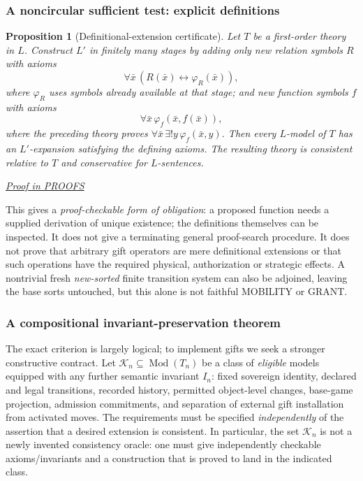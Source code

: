 \documentclass[11pt,letterpaper]{article}
\newtheorem{proposition}[theorem]{Proposition}
\theoremstyle{definition}\newtheorem{definition}[theorem]{Definition}\newtheorem{example}[theorem]{Example}
\theoremstyle{remark}\newtheorem{remark}[theorem]{Remark}
\newcommand{\Mod}{\operatorname{Mod}}
\newcommand{\prooflink}[1]{\par\noindent\hfill\small\hyperref[#1]{\textit{Proof in PROOFS}}\normalsize}
\begin{document}
\subsubsection{A noncircular sufficient test: explicit definitions}

\begin{proposition}[Definitional-extension certificate]\label{induct:prop:definitional}
Let $T$ be a first-order theory in $L$. Construct $L'$ in finitely many stages by adding only new relation symbols $R$ with axioms
\[
\forall\bar x\,(R(\bar x)\leftrightarrow\varphi_R(\bar x)),
\]
where $\varphi_R$ uses symbols already available at that stage; and new function symbols $f$ with axioms
\[
\forall\bar x\,\varphi_f(\bar x,f(\bar x)),
\]
where the preceding theory proves $\forall\bar x\,\exists!y\,\varphi_f(\bar x,y)$.
Then every $L$-model of $T$ has an $L'$-expansion satisfying the defining axioms. The resulting theory is consistent relative to $T$ and conservative for $L$-sentences.
\end{proposition}
\label{br:induct:stmt:3}\prooflink{br:induct:proof:3}


\noindent This gives a \emph{proof-checkable form of obligation}: a proposed function needs a supplied derivation of unique existence; the definitions themselves can be inspected. It does not give a terminating general proof-search procedure. It does not prove that arbitrary gift operators are mere definitional extensions or that such operations have the required physical, authorization or strategic effects. A nontrivial fresh \emph{new-sorted} finite transition system can also be adjoined, leaving the base sorts untouched, but this alone is not faithful MOBILITY or GRANT.

\subsubsection{A compositional invariant-preservation theorem}

The exact criterion is largely logical; to implement gifts we seek a stronger constructive contract. Let \(\mathcal K_n\subseteq\Mod(T_n)\) be a class of \emph{eligible} models equipped with any further semantic invariant \(I_n\): fixed sovereign identity, declared and legal transitions, recorded history, permitted object-level changes, base-game projection, admission commitments, and separation of external gift installation from activated moves. The requirements must be specified \emph{independently} of the assertion that a desired extension is consistent. In particular, the set $\mathcal K_n$ is not a newly invented consistency oracle: one must give independently checkable axioms/invariants and a construction that is proved to land in the indicated class.
\end{document}
